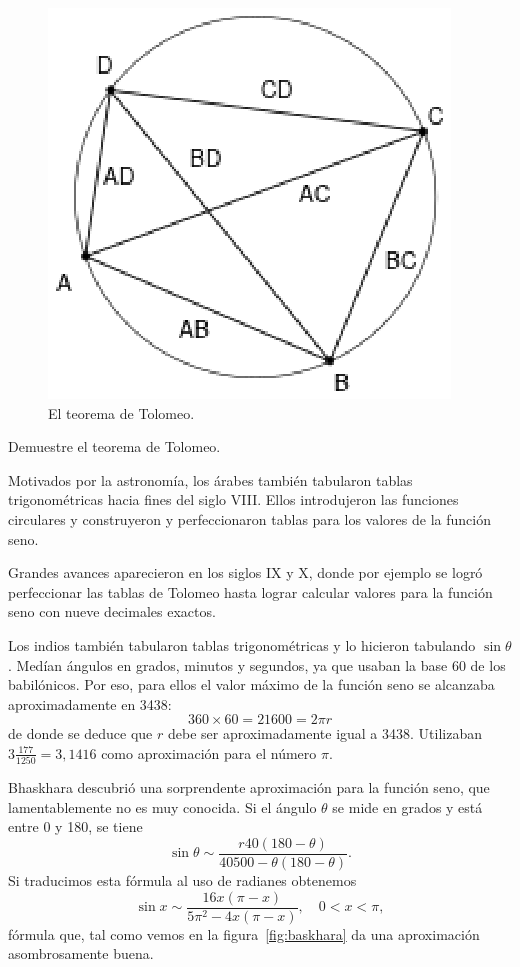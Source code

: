 \begin{figure}[h]
   \centering
   \includegraphics[scale=0.6]{images/tolomeo}
   \caption{El teorema de Tolomeo.}
   \label{fig:Tolomeo}
\end{figure}

\begin{exercise}
	Demuestre el teorema de Tolomeo.
\end{exercise}

Motivados por la astronomía, los árabes también tabularon tablas
trigonométricas hacia fines del siglo VIII. Ellos introdujeron las funciones
circulares y construyeron y perfeccionaron tablas para los valores de la
función seno.  

Grandes avances aparecieron en los siglos IX y X, donde por
ejemplo se logró perfeccionar las tablas de Tolomeo hasta lograr calcular
valores para la función seno con nueve decimales exactos. 

Los indios también tabularon tablas trigonométricas y lo hicieron tabulando
$\sin\theta$.  Medían ángulos en grados, minutos y segundos, ya que usaban la
base 60 de los babilónicos. Por eso, para ellos el valor máximo de la función
seno se alcanzaba aproximadamente en 3438:
\[
	360\times 60=21600=2\pi r
\]
de donde se deduce que $r$ debe ser aproximadamente igual a 3438. Utilizaban 
$3\frac{177}{1250}=3,1416$ como aproximación para el número $\pi$. 

Bhaskhara descubrió una sorprendente aproximación para la función seno, que
lamentablemente no es muy conocida. Si el ángulo $\theta$ se mide en grados y
está entre 0 y 180, se tiene
\[
	\sin\theta\sim \frac{r40(180-\theta)}{40500-\theta(180-\theta)}.
\]
Si traducimos esta fórmula al uso de radianes obtenemos
\[
	\sin x\sim\frac{16x(\pi-x)}{5\pi^2-4x(\pi-x)},\quad 0<x<\pi,
\]
fórmula que, tal como vemos en la figura~\ref{fig:baskhara} da una aproximación
asombrosamente buena.  

